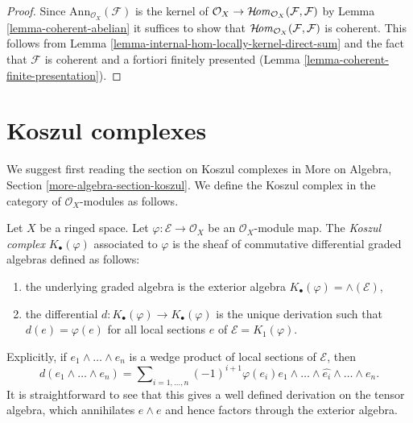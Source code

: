 \begin{proof}
Since $\text{Ann}_{\mathcal{O}_X}(\mathcal{F})$ is the kernel of
$\mathcal{O}_X \to \mathop{\mathcal{H}\!\mathit{om}}\nolimits_{\mathcal{O}_X}(\mathcal{F}, \mathcal{F})$
by Lemma \ref{lemma-coherent-abelian} it suffices
to show that $\mathop{\mathcal{H}\!\mathit{om}}\nolimits_{\mathcal{O}_X}(\mathcal{F}, \mathcal{F})$ is
coherent. This follows from 
Lemma \ref{lemma-internal-hom-locally-kernel-direct-sum}
and the fact that $\mathcal{F}$ is coherent and a fortiori finitely presented
(Lemma \ref{lemma-coherent-finite-presentation}).
\end{proof}





\section{Koszul complexes}
\label{section-koszul-complex}

\noindent
We suggest first reading the section on Koszul complexes in
More on Algebra, Section \ref{more-algebra-section-koszul}.
We define the Koszul complex in the category of $\mathcal{O}_X$-modules
as follows.

\begin{definition}
\label{definition-koszul}
Let $X$ be a ringed space. Let $\varphi : \mathcal{E} \to \mathcal{O}_X$
be an $\mathcal{O}_X$-module map. The
{\it Koszul complex} $K_\bullet(\varphi)$ associated to $\varphi$
is the sheaf of commutative differential graded algebras defined as follows:
\begin{enumerate}
\item the underlying graded algebra is the exterior algebra
$K_\bullet(\varphi) = \wedge(\mathcal{E})$,
\item the differential $d : K_\bullet(\varphi) \to K_\bullet(\varphi)$
is the unique derivation such that $d(e) = \varphi(e)$ for all
local sections $e$ of $\mathcal{E} = K_1(\varphi)$.
\end{enumerate}
\end{definition}

\noindent
Explicitly, if $e_1 \wedge \ldots \wedge e_n$ is a wedge product of local
sections of $\mathcal{E}$, then
$$
d(e_1 \wedge \ldots \wedge e_n) =
\sum\nolimits_{i = 1, \ldots, n} (-1)^{i + 1}
\varphi(e_i)e_1 \wedge \ldots \wedge \widehat{e_i} \wedge \ldots \wedge e_n.
$$
It is straightforward to see that this gives a well defined derivation
on the tensor algebra, which annihilates $e \wedge e$ and hence factors
through the exterior algebra.

